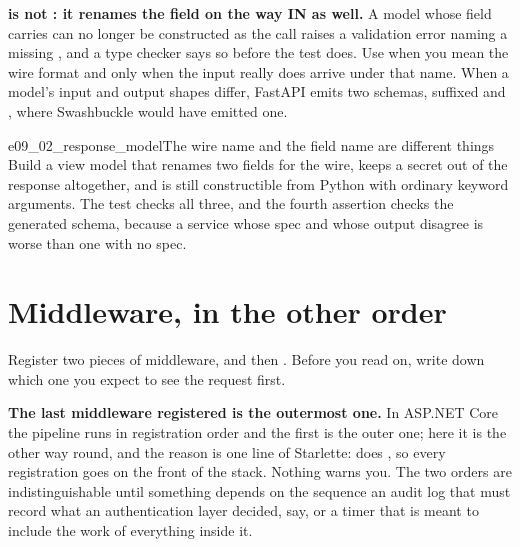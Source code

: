 \begin{trapbox}
\textbf{ is not : it renames the field on
the way IN as well.} A model whose field carries 
can no longer be constructed as  \dash{} the
call raises a validation error naming a missing , and a
type checker says so before the test does. Use 
when you mean the wire format and  only when the input really
does arrive under that name. When a model's input and output shapes differ,
FastAPI emits two schemas, suffixed  and , where
Swashbuckle would have emitted one.
\end{trapbox}

\begin{exercise}{e09_02_response_model}{The wire name and the field name are different things}
Build a view model that renames two fields for the wire, keeps a secret out
of the response altogether, and is still constructible from Python with
ordinary keyword arguments. The test checks all three, and the fourth
assertion checks the generated schema, because a service whose spec and whose
output disagree is worse than one with no spec.
\end{exercise}

\section{Middleware, in the other order}
\label{sec:ch09-middleware}

Register two pieces of middleware,  and then .
Before you read on, write down which one you expect to see the request first.



\begin{trapbox}
\textbf{The last middleware registered is the outermost one.} In ASP.NET
Core the pipeline runs in registration order and the first  is
the outer one; here it is the other way round, and the reason is one line of
Starlette:  does
, so every registration goes on
the front of the stack. Nothing warns you. The two orders are
indistinguishable until something depends on the sequence \dash{} an audit
log that must record what an authentication layer decided, say, or a timer
that is meant to include the work of everything inside it.
\end{trapbox}

